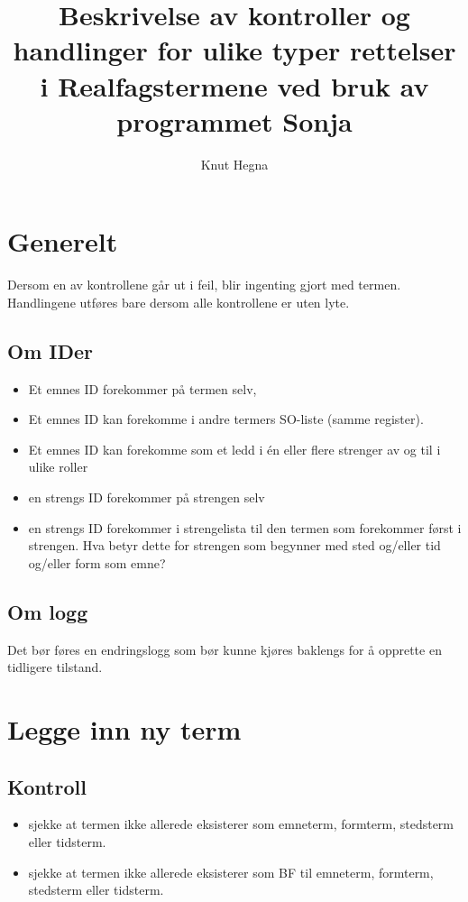 \documentclass[a4paper,10pt,norsk]{article}
\title{Beskrivelse av kontroller og handlinger for ulike typer rettelser i Realfagstermene ved bruk av programmet Sonja}
\author{Knut Hegna}
\begin{document}
\maketitle
\tableofcontents
\newpage

\section*{Generelt}
Dersom en av kontrollene går ut i feil, blir ingenting gjort med termen.
Handlingene utføres bare dersom alle kontrollene er uten lyte.

\subsection*{Om IDer}
\begin{itemize}
\item Et emnes ID forekommer på termen selv, 
\item Et emnes ID kan forekomme i andre termers SO-liste (samme register).
\item Et emnes ID kan forekomme som et ledd i én eller flere strenger av og til i ulike roller
\item en strengs ID forekommer på strengen selv
\item en strengs ID forekommer i strengelista til den termen som forekommer først i strengen. Hva betyr dette for strengen som begynner med sted og/eller tid og/eller form som emne?
\end{itemize}
\subsection*{Om logg}
Det bør føres en endringslogg som bør kunne kjøres baklengs for å opprette en tidligere tilstand.

\section{Legge inn ny term}\label{nyterm}
\subsection*{Kontroll}
\begin{itemize}
\item sjekke at termen ikke allerede eksisterer som emneterm, formterm, stedsterm eller tidsterm.
\item sjekke at termen ikke allerede eksisterer som BF til emneterm, formterm, stedsterm eller tidsterm.
\end{itemize}
\end{document}
